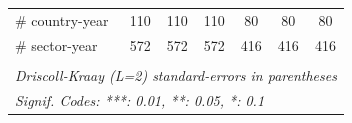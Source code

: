 \documentclass[a4paper]{article}
\begin{document}
\begin{table}[h!]
\begin{tabular}{lcccccc}
      \# country-year           & 110                   & 110                    & 110                    & 80                     & 80                     & 80\\  
      \# sector-year            & 572                   & 572                    & 572                    & 416                    & 416                    & 416\\  
     \bottomrule \\ [-0.9em]
      \multicolumn{7}{l}{\emph{Driscoll-Kraay (L=2) standard-errors in parentheses}}\\
      \multicolumn{7}{l}{\emph{Signif. Codes: ***: 0.01, **: 0.05, *: 0.1}}\\
   \end{tabular}
   \end{table}
\FloatBarrier
\end{document}
